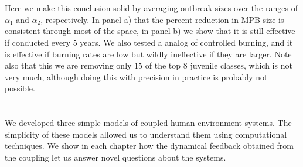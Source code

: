 \documentclass{article}
\begin{document}
\section{}

Here we make this conclusion solid by averaging outbreak sizes over the ranges of $\alpha_1$ and $\alpha_2$, respectively. In panel a) that the percent reduction in MPB size is consistent through most of the space, in panel b) we show that it is still effective if conducted every 5 years. We also tested a analog of controlled burning, and it is effective if burning rates are low but wildly ineffective if they are larger. Note also that this we are removing only $15$ of the top 8 juvenile classes, which is not very much, although doing this with precision in practice is probably not possible. 

\section{} 

We developed three simple models of coupled human-environment systems. The simplicity of these models allowed us to understand them using computational techniques. We show in each chapter how the dynamical feedback obtained from the coupling let us answer novel questions about the systems.
\section{}
\end{document}
